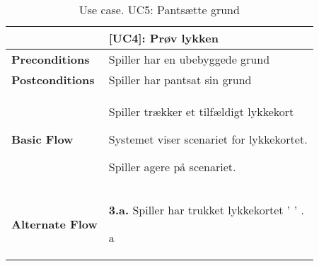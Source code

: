 \documentclass[class=article, crop=false]{standalone}
\begin{document}
    \begin{table}[H]
        \caption{Use case. UC5: Pantsætte grund}
        \begin{tabularx}{\textwidth}{|l|X|}
            \hline
            & \textbf{[UC4]: Prøv lykken}   \\ \hline
            \textbf{Preconditions}       & Spiller har en ubebyggede grund\\ \hline
            \textbf{Postconditions}      & Spiller har pantsat sin grund\\ \hline


            \textbf{Basic Flow} & \begin{tabenum}
                                      \item Spiller trækker et tilfældigt lykkekort
                                      \item Systemet viser scenariet for lykkekortet.
                                      \item Spiller agere på scenariet.
            \end{tabenum}   \\ \hline




            \textbf{Alternate Flow}   & \textbf{3.a.} Spiller har trukket lykkekortet ' ' .
            \begin{enumerate} \begin{tabenum}
                                  \item a
            \end{tabenum} \end{enumerate}
            \\



            \hline

        \end{tabularx}


    \end{table}
\end{document}
